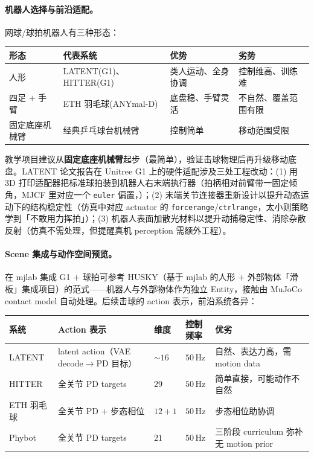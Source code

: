 \paragraph{机器人选择与前沿适配。}网球/球拍机器人有三种形态：

\begin{center}
\small
\begin{tabular}{@{}llp{3.2cm}p{3.2cm}@{}}
\toprule
形态 & 代表系统 & 优势 & 劣势 \\
\midrule
人形 & LATENT(G1)、HITTER(G1) & 类人运动、全身协调 & 控制维高、训练难 \\
四足 $+$ 手臂 & ETH 羽毛球(ANYmal-D) & 底盘稳、手臂灵活 & 不自然、覆盖范围有限 \\
固定底座机械臂 & 经典乒乓球台机械臂 & 控制简单 & 移动范围受限 \\
\bottomrule
\end{tabular}
\end{center}

教学项目建议从\textbf{固定底座机械臂}起步（最简单），验证击球物理后再升级移动底盘。LATENT 论文报告在 Unitree G1 上的硬件适配涉及三处工程改动\cite{tennis_latent2026}：(1) 用 3D 打印适配器把标准球拍装到机器人右末端执行器（拍柄相对前臂带一固定倾角，MJCF 里对应一个 \texttt{euler} 偏置，）；(2) 末端关节连接器重新设计以提升动态运动下的结构稳定性（仿真中对应 actuator 的 \texttt{forcerange}/\texttt{ctrlrange}，太小则策略学到「不敢用力挥拍」）；(3) 机器人表面加散光材料以提升动捕稳定性、消除杂散反射（仿真不需处理，但提醒真机 perception 需额外工程）。

\paragraph{Scene 集成与动作空间预览。}在 mjlab 集成 G1 $+$ 球拍可参考 HUSKY（基于 mjlab 的人形 $+$ 外部物体「滑板」集成项目\cite{husky2026}）的范式——机器人与外部物体作为独立 Entity，接触由 MuJoCo contact model 自动处理。后续击球的 action 表示，前沿系统各异：

\begin{center}
\small
\begin{tabular}{@{}llllp{3.0cm}@{}}
\toprule
系统 & Action 表示 & 维度 & 控制频率 & 优劣 \\
\midrule
LATENT & latent action（VAE decode$\to$PD 目标） & $\sim16$ & $50$\,Hz & 自然、表达力高，需 motion data \\
HITTER & 全关节 PD targets & $29$ & $50$\,Hz & 简单直接，可能动作不自然 \\
ETH 羽毛球 & 全关节 PD $+$ 步态相位 & $12{+}1$ & $50$\,Hz & 步态相位助协调 \\
Phybot & 全关节 PD targets & $21$ & $50$\,Hz & 三阶段 curriculum 弥补无 motion prior \\
\bottomrule
\end{tabular}
\end{center}

